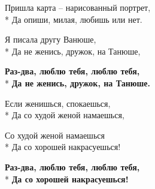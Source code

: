 \medskip

\begin{minipage}{\linewidth}
Пришла карта – нарисованный портрет,\\*
Да опиши, милая, любишь или нет.\\
\end{minipage}\par\medskip\nobreak

\medskip

\begin{minipage}{\linewidth}
Я писала другу Ванюше,\\*
Да не женись, дружок, на Танюше,\\
\end{minipage}\par\medskip\nobreak

\medskip

\begin{minipage}{\linewidth}
\hspace*{1.5em}\textbf{Раз-два, люблю тебя, люблю тебя,}\\*
\hspace*{1.5em}\textbf{Да не женись, дружок, на Танюше.}\\
\end{minipage}\par\medskip\nobreak

\medskip

\begin{minipage}{\linewidth}
Если женишься, спокаешься,\\*
Да со худой женой намаешься,\\
\end{minipage}\par\medskip\nobreak

\medskip

\begin{minipage}{\linewidth}
Со худой женой намаешься\\*
Да со хорошей накрасуешься!\\
\end{minipage}\par\medskip\nobreak

\medskip

\begin{minipage}{\linewidth}
\hspace*{1.5em}\textbf{Раз-два, люблю тебя, люблю тебя,}\\*
\hspace*{1.5em}\textbf{Да со хорошей накрасуешься!}\\
\end{minipage}

